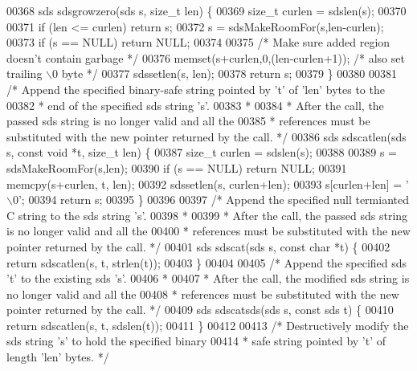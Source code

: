 \begin{DoxyCode}
{00368 sds sdsgrowzero(sds s, size\_t len) \{
00369     size\_t curlen = sdslen(s);
00370 
00371     \textcolor{keywordflow}{if} (len <= curlen) \textcolor{keywordflow}{return} s;
00372     s = sdsMakeRoomFor(s,len-curlen);
00373     \textcolor{keywordflow}{if} (s == NULL) \textcolor{keywordflow}{return} NULL;
00374 
00375     \textcolor{comment}{/* Make sure added region doesn't contain garbage */}
00376     memset(s+curlen,0,(len-curlen+1)); \textcolor{comment}{/* also set trailing \(\backslash\)0 byte */}
00377     sdssetlen(s, len);
00378     \textcolor{keywordflow}{return} s;
00379 \}
00380 
00381 \textcolor{comment}{/* Append the specified binary-safe string pointed by 't' of 'len' bytes to the}
00382 \textcolor{comment}{ * end of the specified sds string 's'.}
00383 \textcolor{comment}{ *}
00384 \textcolor{comment}{ * After the call, the passed sds string is no longer valid and all the}
00385 \textcolor{comment}{ * references must be substituted with the new pointer returned by the call. */}
00386 sds sdscatlen(sds s, \textcolor{keyword}{const} \textcolor{keywordtype}{void} *t, size\_t len) \{
00387     size\_t curlen = sdslen(s);
00388 
00389     s = sdsMakeRoomFor(s,len);
00390     \textcolor{keywordflow}{if} (s == NULL) \textcolor{keywordflow}{return} NULL;
00391     memcpy(s+curlen, t, len);
00392     sdssetlen(s, curlen+len);
00393     s[curlen+len] = \textcolor{stringliteral}{'\(\backslash\)0'};
00394     \textcolor{keywordflow}{return} s;
00395 \}
00396 
00397 \textcolor{comment}{/* Append the specified null termianted C string to the sds string 's'.}
00398 \textcolor{comment}{ *}
00399 \textcolor{comment}{ * After the call, the passed sds string is no longer valid and all the}
00400 \textcolor{comment}{ * references must be substituted with the new pointer returned by the call. */}
00401 sds sdscat(sds s, \textcolor{keyword}{const} \textcolor{keywordtype}{char} *t) \{
00402     \textcolor{keywordflow}{return} sdscatlen(s, t, strlen(t));
00403 \}
00404 
00405 \textcolor{comment}{/* Append the specified sds 't' to the existing sds 's'.}
00406 \textcolor{comment}{ *}
00407 \textcolor{comment}{ * After the call, the modified sds string is no longer valid and all the}
00408 \textcolor{comment}{ * references must be substituted with the new pointer returned by the call. */}
00409 sds sdscatsds(sds s, \textcolor{keyword}{const} sds t) \{
00410     \textcolor{keywordflow}{return} sdscatlen(s, t, sdslen(t));
00411 \}
00412 
00413 \textcolor{comment}{/* Destructively modify the sds string 's' to hold the specified binary}
00414 \textcolor{comment}{ * safe string pointed by 't' of length 'len' bytes. */}
}
\end{DoxyCode}

